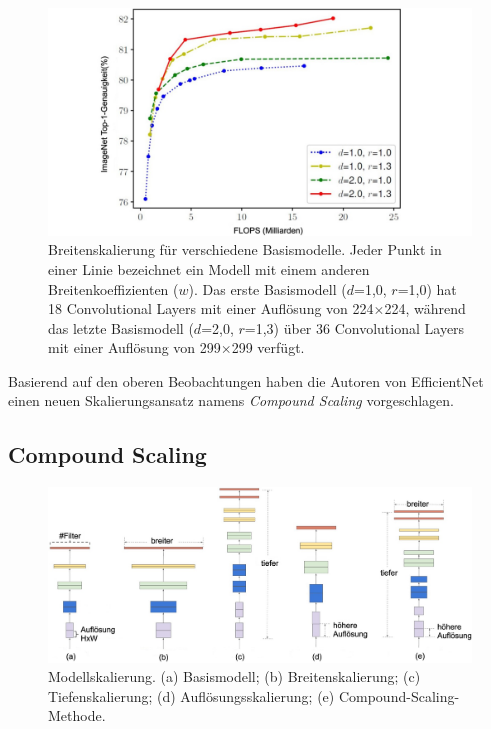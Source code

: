 \begin{figure}[!h]
	\centering
	\includegraphics[width=\linewidth]{images/ScalingWidthForDiffBaselineModels}
	\caption{Breitenskalierung für verschiedene Basismodelle. Jeder Punkt in einer Linie bezeichnet ein Modell mit einem anderen Breitenkoeffizienten ($w$). Das erste Basismodell ($d$=1,0, $r$=1,0) hat 18 Convolutional Layers mit einer Auflösung von 224$\times$224, während das letzte Basismodell ($d$=2,0, $r$=1,3) über 36 Convolutional Layers mit einer Auflösung von 299$\times$299 verfügt. \protect\cite{tan2020efficientnet}}
	\label{fig:ScalingWidthForDiffBaselineModels}
\end{figure}

Basierend auf den oberen Beobachtungen haben die Autoren von EfficientNet einen neuen Skalierungsansatz namens \emph{Compound Scaling} vorgeschlagen.

\subsection{Compound Scaling}

\begin{figure}[H]
	\centering
	\includegraphics[width=\linewidth]{images/compoundScaling}
	\caption{Modellskalierung. (a) Basismodell; (b) Breitenskalierung; (c) Tiefenskalierung; (d) Auflösungsskalierung; (e) Compound-Scaling-Methode. \protect\cite{tan2020efficientnet}}
	\label{fig:compoundScaling}
\end{figure}

